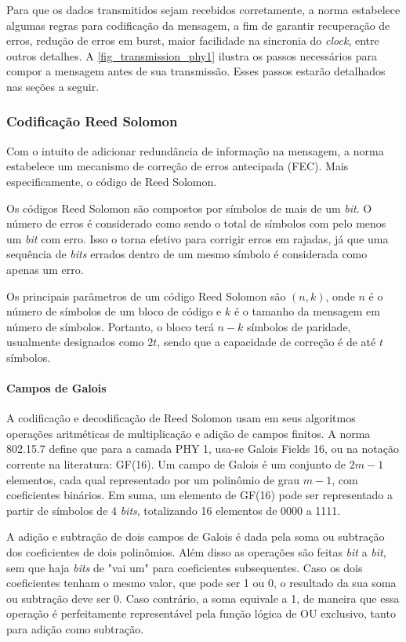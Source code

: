 	Para que os dados transmitidos sejam recebidos corretamente, a norma estabelece algumas regras para codificação da mensagem, a fim de garantir recuperação de erros, redução de erros em burst, maior facilidade na sincronia do \textit{clock}, entre outros detalhes. A \autoref{fig_transmission_phy1} ilustra os passos necessários para compor a mensagem antes de sua transmissão. Esses passos estarão detalhados nas seções a seguir.
	
	
	\subsubsection{Codificação Reed Solomon}
	
	Com o intuito de adicionar redundância de informação na mensagem, a norma estabelece um mecanismo de correção de erros antecipada (FEC). Mais especificamente, o código de Reed Solomon. 
	
	Os códigos Reed Solomon são compostos por símbolos de mais de um \textit{bit}. O número de erros é considerado como sendo o total de símbolos com pelo menos um \textit{bit} com erro. Isso o torna efetivo para corrigir erros em rajadas, já que uma sequência de \textit{bits} errados dentro de um mesmo símbolo é considerada como apenas um erro. 
	
	Os principais parâmetros de um código Reed Solomon são $(n, k)$, onde $n$ é o número de símbolos de um bloco de código e $k$ é o tamanho da mensagem em número de símbolos. Portanto, o bloco terá $n - k$ símbolos de paridade, usualmente designados como $2t$, sendo que a capacidade de correção é de até $t$ símbolos.
	
	\paragraph{Campos de Galois}
	
	A codificação e decodificação de Reed Solomon usam em seus algoritmos operações aritméticas de multiplicação e adição de campos finitos. A norma 802.15.7 define que para a camada PHY 1, usa-se Galois Fields 16, ou na notação corrente na literatura: GF(16). Um campo de Galois é um conjunto de $2m - 1$ elementos, cada qual representado por um polinômio de grau $m - 1$, com coeficientes binários. Em suma, um elemento de GF(16) pode ser representado a partir de símbolos de 4 \textit{bits}, totalizando 16 elementos de 0000 a 1111. 
	
	A adição e subtração de dois campos de Galois é dada pela soma ou subtração dos coeficientes de dois polinômios. Além disso as operações são feitas \textit{bit} a \textit{bit}, sem que haja \textit{bits} de "vai um" para coeficientes subsequentes. Caso os dois coeficientes tenham o mesmo valor, que pode ser 1 ou 0, o resultado da sua soma ou subtração deve ser 0. Caso contrário, a soma equivale a 1, de maneira que essa operação é perfeitamente representável pela função lógica de OU exclusivo, tanto para adição como subtração.
	
